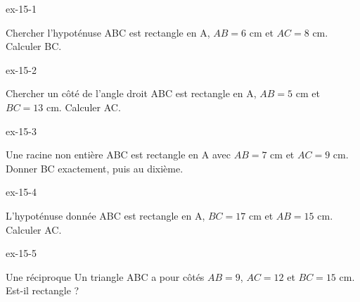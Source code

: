 \clearpage{}
\begin{blocLivre}{ex-15-1}\begin{exercice}[1]{Chercher l’hypoténuse}
ABC est rectangle en A, $AB=6$ cm et $AC=8$ cm. Calculer BC.
\label{fig-ex-15-1}
\end{exercice}\end{blocLivre}
\begin{blocLivre}{ex-15-2}\begin{exercice}[1]{Chercher un côté de l’angle droit}
ABC est rectangle en A, $AB=5$ cm et $BC=13$ cm. Calculer AC.
\label{fig-ex-15-2}
\end{exercice}\end{blocLivre}
\begin{blocLivre}{ex-15-3}\begin{exercice}[1]{Une racine non entière}
ABC est rectangle en A avec $AB=7$ cm et $AC=9$ cm. Donner BC exactement, puis au dixième.
\label{fig-ex-15-3}
\end{exercice}\end{blocLivre}
\begin{blocLivre}{ex-15-4}\begin{exercice}[1]{L’hypoténuse donnée}
ABC est rectangle en A, $BC=17$ cm et $AB=15$ cm. Calculer AC.
\label{fig-ex-15-4}
\end{exercice}\end{blocLivre}
\begin{blocLivre}{ex-15-5}\begin{exercice}[1]{Une réciproque}
Un triangle ABC a pour côtés $AB=9$, $AC=12$ et $BC=15$ cm. Est-il rectangle ?
\label{fig-ex-15-5}
\end{exercice}\end{blocLivre}

